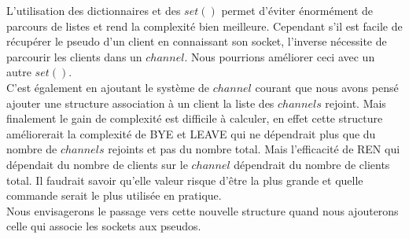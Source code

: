 \documentclass[12pt]{article}
\begin{document}
L'utilisation des dictionnaires et des $set()$ permet d'éviter énormément de parcours
de listes et rend la complexité bien meilleure. Cependant s'il est facile de récupérer le
pseudo d'un client en connaissant son socket, l'inverse nécessite de parcourir les clients
dans un $channel$. Nous pourrions améliorer ceci avec un autre $set()$.
\\C'est également en ajoutant le système de $channel$ courant que nous avons pensé ajouter
une structure association à un client la liste des $channels$ rejoint. Mais finalement le
gain de complexité est difficile à calculer, en effet cette structure améliorerait la complexité
de BYE et LEAVE qui ne dépendrait plus que du nombre de $channels$ rejoints et pas du nombre total.
Mais l'efficacité de REN qui dépendait du nombre de clients sur le $channel$ dépendrait du nombre de clients
total. Il faudrait savoir qu'elle valeur risque d'être la plus grande et quelle commande serait
le plus utilisée en pratique.
\\Nous envisagerons le passage vers cette nouvelle structure quand nous ajouterons celle qui
associe les sockets aux pseudos.
\\
\end{document}
